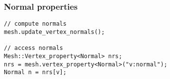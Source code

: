 \begin{frame}[fragile]
\frametitle{Normal properties}
\lstset{ numbers=none, xleftmargin=0cm}
\begin{lstlisting}
// compute normals
mesh.update_vertex_normals();

// access normals
Mesh::Vertex_property<Normal> nrs;
nrs = mesh.vertex_property<Normal>("v:normal");
Normal n = nrs[v];
\end{lstlisting}
\end{frame}
